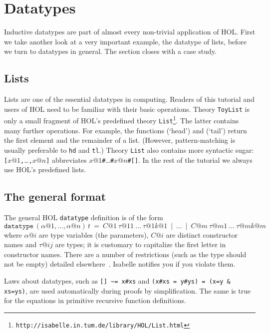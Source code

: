 \section{Datatypes}
\label{sec:datatype}

Inductive datatypes are part of almost every non-trivial application of HOL.
First we take another look at a very important example, the datatype of
lists, before we turn to datatypes in general. The section closes with a
case study.


\subsection{Lists}

Lists are one of the essential datatypes in computing. Readers of this
tutorial and users of HOL need to be familiar with their basic operations.
Theory \texttt{ToyList} is only a small fragment of HOL's predefined theory
\texttt{List}\footnote{\texttt{http://isabelle.in.tum.de/library/HOL/List.html}}.
The latter contains many further operations. For example, the functions
 (`head') and  (`tail') return the first
element and the remainder of a list. (However, pattern-matching is usually
preferable to \texttt{hd} and \texttt{tl}.)  Theory \texttt{List} also
contains more syntactic sugar:
\texttt{[}$x@1$\texttt{,}\dots\texttt{,}$x@n$\texttt{]} abbreviates
$x@1$\texttt{\#}\dots\texttt{\#}$x@n$\texttt{\#[]}.  In the rest of the
tutorial we always use HOL's predefined lists.


\subsection{The general format}
\label{sec:general-datatype}

The general HOL \texttt{datatype} definition is of the form
\[
\mathtt{datatype}~(\alpha@1, \dots, \alpha@n) \, t ~=~
C@1~\tau@{11}~\dots~\tau@{1k@1} ~\mid~ \dots ~\mid~
C@m~\tau@{m1}~\dots~\tau@{mk@m}
\]
where $\alpha@i$ are type variables (the parameters), $C@i$ are distinct
constructor names and $\tau@{ij}$ are types; it is customary to capitalize
the first letter in constructor names. There are a number of
restrictions (such as the type should not be empty) detailed
elsewhere~\cite{isabelle-HOL}. Isabelle notifies you if you violate them.

Laws about datatypes, such as \verb$[] ~= x#xs$ and \texttt{(x\#xs = y\#ys) =
  (x=y \& xs=ys)}, are used automatically during proofs by simplification.
The same is true for the equations in primitive recursive function
definitions.

